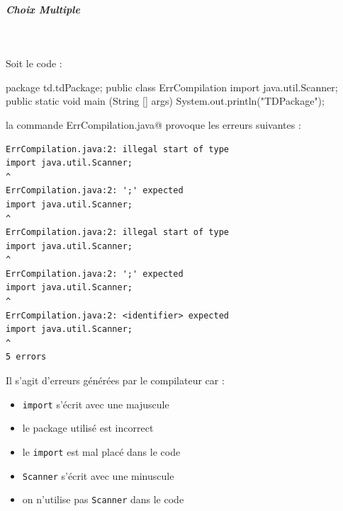 \documentclass[11pt,a4paper]{article}
\begin{document}
			
		\subparagraph{Choix Multiple } 
		
                \textcolor{white}{.} \par
            Soit le code :
            \par
        \begin{Java}
package td.tdPackage; 
public class ErrCompilation {
    import java.util.Scanner;
    public static void main (String [] args) { 
        System.out.println("TDPackage");
    }
}							\end{Java}
								la commande \verb@javac ErrCompilation.java@ 
								provoque les erreurs suivantes :
							
            \par
        \begin{scriptsize}\begin{verbatim}
ErrCompilation.java:2: illegal start of type
import java.util.Scanner;
^
ErrCompilation.java:2: ';' expected
import java.util.Scanner;
^
ErrCompilation.java:2: illegal start of type
import java.util.Scanner;
^
ErrCompilation.java:2: ';' expected
import java.util.Scanner;
^
ErrCompilation.java:2: <identifier> expected
import java.util.Scanner;
^
5 errors
							\end{verbatim}\end{scriptsize}
							Il s'agit d'erreurs g\'en\'er\'ees par le compilateur car :
							
            \par
        
            \begin{itemize} 
        
            \item[ \ding{"6D} ] \verb|import| s'\'ecrit avec une majuscule
        
            \item[ \ding{"6D} ] le package utilis\'e est incorrect
        
            \item[ \ding{"6D} ] le \verb|import| est mal plac\'e dans le code
        
            \item[ \ding{"6D} ] \verb|Scanner| s'\'ecrit avec une minuscule
        
            \item[ \ding{"6D} ] on n'utilise pas \verb|Scanner| dans le code
        
            \end{itemize} 
        
\end{document}
